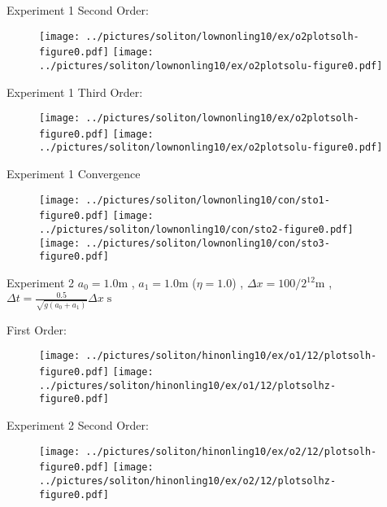 \documentclass[pdf]{beamer}
\begin{document}
\begin{frame}{Experiment 1}
Second Order:

\begin{figure}
\texttt{[image: ../pictures/soliton/lownonling10/ex/o2plotsolh-figure0.pdf]}
\texttt{[image: ../pictures/soliton/lownonling10/ex/o2plotsolu-figure0.pdf]}
\end{figure}
\end{frame}

\begin{frame}{Experiment 1}
Third Order:

\begin{figure}
\texttt{[image: ../pictures/soliton/lownonling10/ex/o2plotsolh-figure0.pdf]}
\texttt{[image: ../pictures/soliton/lownonling10/ex/o2plotsolu-figure0.pdf]}
\end{figure}
\end{frame}

\begin{frame}{Experiment 1}
Convergence

\begin{figure}
\texttt{[image: ../pictures/soliton/lownonling10/con/sto1-figure0.pdf]}
\texttt{[image: ../pictures/soliton/lownonling10/con/sto2-figure0.pdf]}
\texttt{[image: ../pictures/soliton/lownonling10/con/sto3-figure0.pdf]}
\end{figure}
\end{frame}

\begin{frame}{Experiment 2}
$a_0 = 1.0\text{m}$ , $a_1 = 1.0\text{m}$ ($\eta = 1.0$) , $\Delta x = 100 /2^{12}\text{m}$ , $\Delta t = \frac{0.5}{\sqrt{g (a_0 + a_1)}} \Delta x \; \text{s}$

First Order:

\begin{figure}
\texttt{[image: ../pictures/soliton/hinonling10/ex/o1/12/plotsolh-figure0.pdf]}
\texttt{[image: ../pictures/soliton/hinonling10/ex/o1/12/plotsolhz-figure0.pdf]}
\end{figure}
\end{frame}

\begin{frame}{Experiment 2}
Second Order:

\begin{figure}
\texttt{[image: ../pictures/soliton/hinonling10/ex/o2/12/plotsolh-figure0.pdf]}
\texttt{[image: ../pictures/soliton/hinonling10/ex/o2/12/plotsolhz-figure0.pdf]}
\end{figure}
\end{frame}
\end{document}
